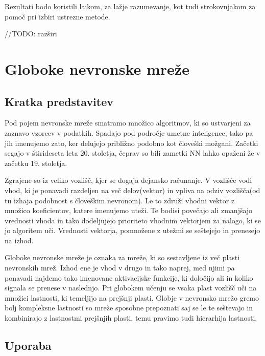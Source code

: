 \documentclass[a4paper, 12pt]{book}
\begin{document}
Rezultati bodo koristili laikom, za lažje razumevanje, kot tudi strokovnjakom za pomoč pri izbiri ustrezne metode.



//TODO: razširi

\chapter{Globoke nevronske mreže}
\label{dnn}

\section{Kratka predstavitev}

Pod pojem nevronske mreže smatramo množico algoritmov, ki so ustvarjeni za zaznavo vzorcev v podatkih. Spadajo pod področje umetne inteligence, tako pa jih imenujemo zato, ker delujejo približno podobno kot človeški možgani. Začetki segajo v štirideseta leta 20. stoletja, čeprav so bili zametki NN lahko opaženi že v začetku 19. stoletja.\cite{schmidhuber2015deep}


Zgrajene so iz veliko vozlišč, kjer se dogaja dejansko računanje. V vozlišče vodi vhod, ki je ponavadi razdeljen na več delov(vektor) in vpliva na odziv vozlišča(od tu izhaja podobnost s človeškim nevronom). Le to združi vhodni vektor z množico koeficientov, katere imenujemo uteži. Te bodisi povečajo ali zmanjšajo vrednosti vhoda in tako dodeljujejo prioriteto vhodnim vektorjem za nalogo, ki se jo algoritem uči. Vrednosti vektorja, pomnožene z utežmi se seštejejo in prenesejo na izhod.


Globoke nevronske mreže je oznaka za mreže, ki so sestavljene iz več plasti nevronskih mrež. Izhod ene je vhod v drugo in tako naprej, med njimi pa ponavadi najdemo tako imenovane aktivacijske funkcije, ki določijo ali in koliko signala se prenese v naslednjo.
Pri globokem učenju se vsaka plast vozlišč uči na množici lastnosti, ki temeljijo na prejšnji plasti. Globje v nevronsko mrežo gremo bolj kompleksne lastnosti so mreže sposobne prepoznati saj se le te seštevajo in kombinirajo z lastnostmi prejšnjih plasti, temu pravimo tudi hierarhija lastnosti. \cite{schmidhuber2015deep}




\section{Uporaba}
\end{document}
